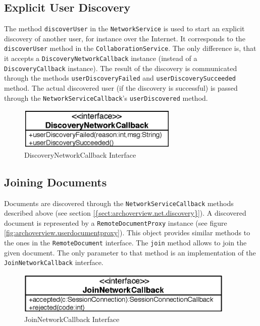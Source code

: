 \subsection{Explicit User Discovery}
The method \texttt{discover\-User} in the \texttt{Network\-Service} is used to 
start an explicit discovery
of another user, for instance over the Internet. It corresponds to the
\texttt{discover\-User} method in the \texttt{Collaboration\-Service}. The
only difference is, that it accepts a \texttt{Discovery\-Network\-Callback}
instance (instead of a \texttt{Discovery\-Callback} instance). The result
of the discovery is communicated through the methods 
\texttt{user\-Discovery\-Failed} and \texttt{user\-Discovery\-Succeeded} method.
The actual discovered user (if the discovery is successful) is passed 
through the \texttt{Network\-Service\-Callback}'s \texttt{user\-Discovered} 
method.

\begin{figure}[H]
 \centering
 \includegraphics[width=7.62cm,height=1.98cm]{../images/finalreport/architecture_discoverynetworkcallback_uml.eps}
 \caption{DiscoveryNetworkCallback Interface}
\end{figure}


\subsection{Joining Documents}
Documents are discovered through the \texttt{Network\-Service\-Callback} methods
described above (see section \ref{{sect:archoverview.net.discovery}}). A discovered document is represented by a \texttt{Remote\-Document\-Proxy} instance (see figure \ref{fig:archoverview.userdocumentproxy}). 
This object provides similar methods
to the ones in the \texttt{Remote\-Document} interface. The \texttt{join}
method allows to join the given document. The only parameter to that method
is an implementation of the \texttt{Join\-Network\-Callback} interface.

\begin{figure}[H]
 \centering
 \includegraphics[width=10.41cm,height=1.98cm]{../images/finalreport/architecture_joinnetworkcallback_uml.eps}
 \caption{JoinNetworkCallback Interface}
\end{figure}

